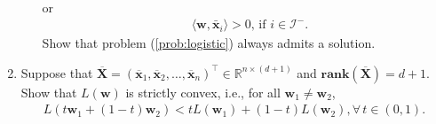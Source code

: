 \documentclass[11pt,letter,notitlepage]{article}
\newcommand{\rank}[1]{ \textbf{rank}  (#1)  }
\begin{document}
\begin{exercise}
\begin{enumerate}
\begin{enumerate}
\begin{align*}
    	    \end{align*}
    	    or
    	    \begin{align*}
    	    &\langle \mathbf{w}, \mathbf{\bar{x}}_i\rangle> 0,\,\text{if\ } i\in\mathcal{I}^-.
    	\end{align*}
    	Show that problem (\ref{prob:logistic}) always admits a solution.
        \end{enumerate}
        \item  Suppose that $\overline{\textbf{X}}=(\overline{\mathbf{x}}_1,\overline{\mathbf{x}}_2,\dots,\overline{\mathbf{x}}_n)^\top\in\mathbb{R}^{n \times (d+1)}$ and $\rank{\overline{\mathbf{X}}}=d+1$. Show that $L(\textbf{w})$ is strictly convex, i.e., for all $\textbf{w}_1\neq \textbf{w}_2$,
    	\begin{align*}
    	    L(t\textbf{w}_1 + (1-t)\textbf{w}_2) < t L(\textbf{w}_1)+(1-t)L(\textbf{w}_2),\forall\, t \in (0,1).
    	\end{align*}

    	
    \end{enumerate}


\end{exercise}
\begin{solution}
    
\end{solution}

\clearpage{$ $}
\end{document}
